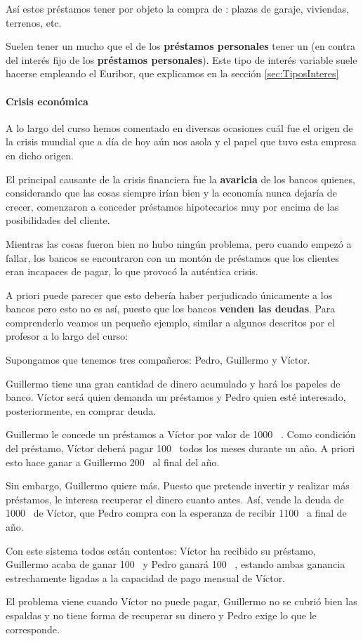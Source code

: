 \documentclass[nochap,palatino,shortheader]{apuntes}
\begin{document}
Así estos préstamos  tener por objeto la compra de : plazas de garaje, viviendas, terrenos, etc.

Suelen tener un  mucho  que el de los \textbf{préstamos personales}  tener un  (en contra del interés fijo de los \textbf{préstamos personales}). Este tipo de interés variable suele hacerse empleando el Euribor, que explicamos en la sección \ref{sec:TiposInteres}

\paragraph{Crisis económica}
A lo largo del curso hemos comentado en diversas ocasiones cuál fue el origen de la crisis mundial que a día de hoy aún nos asola y el papel que tuvo esta empresa en dicho origen.

El principal causante de la crisis financiera fue la \textbf{avaricia} de los bancos quienes, considerando que las cosas siempre irían bien y la economía nunca dejaría de crecer, comenzaron a conceder préstamos hipotecarios muy por encima de las posibilidades del cliente.

Mientras las cosas fueron bien no hubo ningún problema, pero cuando empezó a fallar, los bancos se encontraron con un montón de préstamos que los clientes eran incapaces de pagar, lo que provocó la auténtica crisis.

A priori puede parecer que esto debería haber perjudicado únicamente a los bancos pero esto no es así, puesto que los bancos \textbf{venden las deudas}. Para comprenderlo veamos un pequeño ejemplo, similar a algunos descritos por el profesor a lo largo del curso:

\begin{example}
Supongamos que tenemos tres compañeros: Pedro, Guillermo y Víctor.

Guillermo tiene una gran cantidad de dinero acumulado y hará los papeles de banco. Víctor será quien demanda un préstamos y Pedro quien esté interesado, posteriormente, en comprar deuda.

Guillermo le concede un préstamos a Víctor por valor de 1000 \texteuro\ . Como condición del préstamo, Víctor deberá pagar 100 \texteuro\  todos los meses durante un año. A priori esto hace ganar a Guillermo 200 \texteuro\  al final del año.

Sin embargo, Guillermo quiere más. Puesto que pretende invertir y realizar más préstamos, le interesa recuperar el dinero cuanto antes. Así, vende la deuda de 1000 \texteuro\  de Víctor, que Pedro compra con la esperanza de recibir 1100 \texteuro\  a final de año.

Con este sistema todos están contentos: Víctor ha recibido su préstamo, Guillermo acaba de ganar 100 \texteuro\  y Pedro ganará 100 \texteuro\ , estando ambas ganancia estrechamente ligadas a la capacidad de pago mensual de Víctor.

El problema viene cuando Víctor no puede pagar, Guillermo no se cubrió bien las espaldas y no tiene forma de recuperar su dinero y Pedro exige lo que le corresponde.
\end{example}
\end{document}
